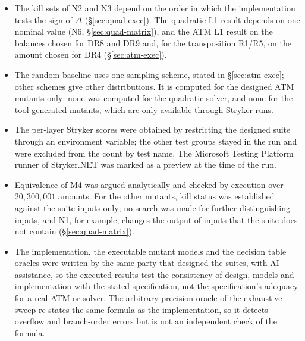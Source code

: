 \documentclass[11pt,a4paper]{article}
\begin{document}
\begin{itemize}
    which include supplementary tests, properties and, for the quadratic
    solver, the exhaustive sweep. The designed suites alone reach 21 of 22
    (95\,\%) and 15 of 21 (71\,\%).
    \item The kill sets of N2 and N3 depend on the order in which the
    implementation tests the sign of \(\Delta\) (\S\ref{sec:quad-exec}). The
    quadratic L1 result depends on one nominal value (N6,
    \S\ref{sec:quad-matrix}), and the ATM L1 result on the balances chosen for DR8 and DR9 and, for the transposition R1/R5, on the amount chosen for DR4 (\S\ref{sec:atm-exec}).
    \item The random baseline uses one sampling scheme, stated in
    \S\ref{sec:atm-exec}; other schemes give other distributions. It is
    computed for the designed ATM mutants only: none was computed for the quadratic solver, and none for the tool-generated mutants, which are only available through Stryker runs.
    \item The per-layer Stryker scores were obtained by restricting the
    designed suite through an environment variable; the other test groups
    stayed in the run and were excluded from the count by test name. The
    Microsoft Testing Platform runner of Stryker.NET was marked as a preview
    at the time of the run.
    \item Equivalence of M4 was argued analytically and checked by execution
    over \(20{,}300{,}001\) amounts. For the other mutants, kill status was
    established against the suite inputs only; no search was made for
    further distinguishing inputs, and N1, for example, changes the output of
    inputs that the suite does not contain (\S\ref{sec:quad-matrix}).
    \item The implementation, the executable mutant models and the
    decision table oracles were written by the same party that designed the
    suites, with AI assistance, so the executed results test the consistency
    of design, models and implementation with the stated specification, not
    the specification's adequacy for a real ATM or solver. The
    arbitrary-precision oracle of the exhaustive sweep re-states the same
    formula as the implementation, so it detects overflow and branch-order
    errors but is not an independent check of the formula.
\end{itemize}
\end{document}

